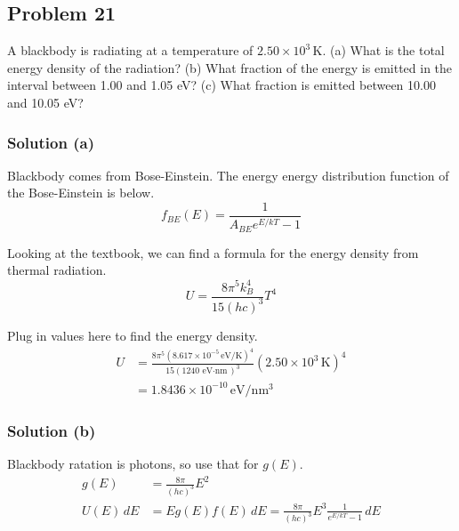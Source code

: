 \documentclass[12pt]{article}
\newcommand{\e}[1]{e^{#1}}
\newcommand{\E}[1]{\times 10^{#1}}
\begin{document}
    \pagebreak
    \subsection{Problem 21}
        A blackbody is radiating at a temperature of $2.50\E{3}\,\unit{\kelvin}$.
        (a) What is the total energy density of the radiation? 
        (b) What fraction of the energy is emitted in the interval between 1.00 and 1.05 eV? 
        (c) What fraction is emitted between 10.00 and 10.05 eV?

        \subsubsection{Solution (a)}
            Blackbody comes from Bose-Einstein.
            The energy energy distribution function of the Bose-Einstein is below.
            \begin{equation}
                f_{BE}(E) = \frac{1}{A_{BE}\e{E/kT} - 1}
            \end{equation}

            Looking at the textbook, we can find a formula for the energy density from thermal radiation.
            \begin{equation}
                U   =   \frac{8\pi^5 k_B^4}{15(hc)^3} T^4
            \end{equation}

            Plug in values here to find the energy density.
            \begin{align}
                U   &=  \frac{8\pi^5 (8.617\E{-5}\,\unit{\eV/\kelvin})^4}{15(1240\,\unit{\eV\cdot\nano\meter})^3} (2.50\E{3}\,\unit{\kelvin})^4\\
                    &=  \boxed{1.8436\E{-10}\,\unit{\eV/\nano\meter^3}}
            \end{align}

        \subsubsection{Solution (b)}
        Blackbody ratation is photons, so use that for $g(E)$.
            \begin{align}
                g(E)    &=  \frac{8\pi}{(hc)^3}E^2\\
                U(E)\,dE    &=  E g(E) f(E)\,dE
                    =   \frac{8\pi}{(hc)^3}E^3 \frac{1}{\e{E/kT} - 1}\,dE\\
            \end{align}
\end{document}
